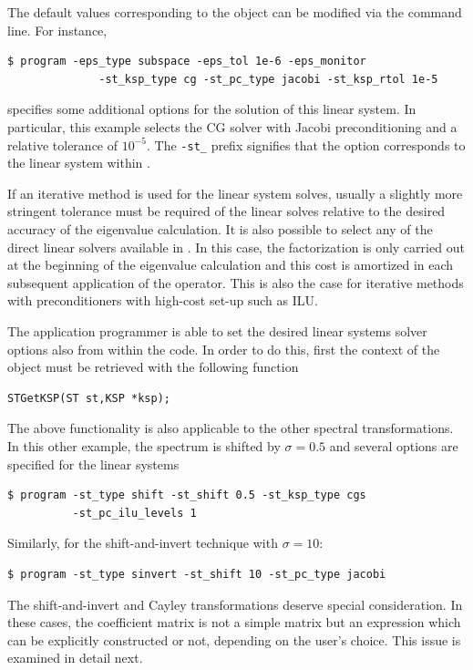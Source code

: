 	The default values corresponding to the  object can be modified via the command line. For instance,
\begin{Verbatim}[fontsize=\small]
	$ program -eps_type subspace -eps_tol 1e-6 -eps_monitor
	          -st_ksp_type cg -st_pc_type jacobi -st_ksp_rtol 1e-5
\end{Verbatim}
specifies some additional options for the solution of this linear system. In particular, this example selects the CG solver with Jacobi preconditioning and a relative tolerance of $10^{-5}$. The \Verb!-st_! prefix signifies that the option corresponds to the linear system within .

	If an iterative method is used for the linear system solves, usually a slightly more stringent tolerance must be required of the linear solves relative to the desired accuracy of the eigenvalue calculation. It is also possible to select any of the direct linear solvers available in \petsc. In this case, the factorization is only carried out at the beginning of the eigenvalue calculation and this cost is amortized in each subsequent application of the operator. This is also the case for iterative methods with preconditioners with high-cost set-up such as ILU.

	The application programmer is able to set the desired linear systems solver options also from within the code. In order to do this, first the context of the  object must be retrieved with the following function
	\begin{Verbatim}[fontsize=\small]
	STGetKSP(ST st,KSP *ksp);
	\end{Verbatim}
	
	The above functionality is also applicable to the other spectral transformations. In this other example, the spectrum is shifted by $\sigma=0.5$ and several options are specified for the linear systems
\begin{Verbatim}[fontsize=\small]
	$ program -st_type shift -st_shift 0.5 -st_ksp_type cgs 
		  -st_pc_ilu_levels 1
\end{Verbatim}

	Similarly, for the shift-and-invert technique with $\sigma=10$:
\begin{Verbatim}[fontsize=\small]
	$ program -st_type sinvert -st_shift 10 -st_pc_type jacobi
\end{Verbatim}
	The shift-and-invert and Cayley transformations deserve special consideration. In these cases, the coefficient matrix is not a simple matrix but an expression which can be explicitly constructed or not, depending on the user's choice. This issue is examined in detail next.

